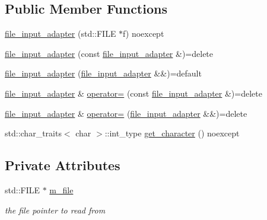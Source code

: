 \subsection*{Public Member Functions}
\begin{DoxyCompactItemize}
\item 
\hyperlink{classnlohmann_1_1detail_1_1file__input__adapter_aeade050f2793280503be93feff2ece5b}{file\+\_\+input\+\_\+adapter} (std\+::\+F\+I\+LE $\ast$f) noexcept
\item 
\hyperlink{classnlohmann_1_1detail_1_1file__input__adapter_a308099b496a0cba2123a06fe99a95d02}{file\+\_\+input\+\_\+adapter} (const \hyperlink{classnlohmann_1_1detail_1_1file__input__adapter}{file\+\_\+input\+\_\+adapter} \&)=delete
\item 
\hyperlink{classnlohmann_1_1detail_1_1file__input__adapter_a10b4dec4e8751a4f8a110fa917f0d5a8}{file\+\_\+input\+\_\+adapter} (\hyperlink{classnlohmann_1_1detail_1_1file__input__adapter}{file\+\_\+input\+\_\+adapter} \&\&)=default
\item 
\hyperlink{classnlohmann_1_1detail_1_1file__input__adapter}{file\+\_\+input\+\_\+adapter} \& \hyperlink{classnlohmann_1_1detail_1_1file__input__adapter_ad59bbc7e3f23dd74475c5cb818784e42}{operator=} (const \hyperlink{classnlohmann_1_1detail_1_1file__input__adapter}{file\+\_\+input\+\_\+adapter} \&)=delete
\item 
\hyperlink{classnlohmann_1_1detail_1_1file__input__adapter}{file\+\_\+input\+\_\+adapter} \& \hyperlink{classnlohmann_1_1detail_1_1file__input__adapter_acfd616c651d601a1dfc7fbdd6973f716}{operator=} (\hyperlink{classnlohmann_1_1detail_1_1file__input__adapter}{file\+\_\+input\+\_\+adapter} \&\&)=delete
\item 
std\+::char\+\_\+traits$<$ char $>$\+::int\+\_\+type \hyperlink{classnlohmann_1_1detail_1_1file__input__adapter_a300fa4e2da1891e97eb0d85bf14cb022}{get\+\_\+character} () noexcept
\end{DoxyCompactItemize}
\subsection*{Private Attributes}
\begin{DoxyCompactItemize}
\item 
std\+::\+F\+I\+LE $\ast$ \hyperlink{classnlohmann_1_1detail_1_1file__input__adapter_a164fbe2739ac97e517e22bc1fff1c174}{m\+\_\+file}
\begin{DoxyCompactList}\small\item\em the file pointer to read from \end{DoxyCompactList}\end{DoxyCompactItemize}


